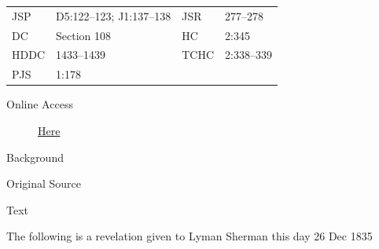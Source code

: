 				\begin{tabular}{p{0.5in}p{1in}p{0.5in}p{1in}}
				JSP	 	& D5:122--123; J1:137--138		& JSR 		& 277--278 \\
				DC	 	& Section 108 		& HC 		& 2:345 \\
				HDDC 	& 1433--1439		& TCHC 		& 2:338--339 \\
				PJS 	& 1:178			& 	 		&  \\
				\end{tabular}
			
			\begin{description}
				\item[Online Access] \href{https://www.josephsmithpapers.org/paper-summary/revelation-26-december-1835-dc-108/1}{Here}
			\end{description}
			
			\begin{description}
				\item[Background]
			\end{description}
			
			
			\begin{description}
				\item[Original Source]
			\end{description}
			
			
			\begin{description}
				\item[Text]
			\end{description}
			
				The following is a revelation given to Lyman Sherman this day 26 Dec 1835
				
